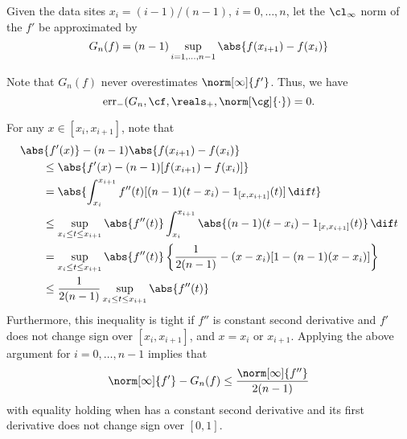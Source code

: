 


Given the data sites $x_i=(i-1)/(n-1)$, $i=0, \ldots, n$, let the $\cl_\infty$ norm of the $f'$ be approximated by
\begin{equation}\label{estfirstderiv}
G_n(f) = (n-1) \sup_{i=1, \ldots, n-1} \abs{f(x_{i+1})-f(x_i)}
\end{equation}

Note that $G_n(f)$ never overestimates $\norm[\infty]{f'}$. Thus, we have
$$\err_{-}(G_n,\cf,\reals_{+},\norm[\cg]{\cdot})=0.$$

For any $x \in [x_{i}, x_{i+1}]$, note that
\begin{align*}
\MoveEqLeft{\abs{f'(x)} - (n-1) \abs{f(x_{i+1})-f(x_i)}} \\
 & \le \abs{f'(x) - (n-1)[f(x_{i+1})-f(x_i)]} \\
&=\abs{ \int_{x_i}^{x_{i+1}} f''(t) [(n-1)(t-x_i) -  1_{[x,x_{i+1}]}(t)] \, \dif t} \\
& \le \sup_{x_i \le t \le x_{i+1}} \abs{f''(t)} \int_{x_i}^{x_{i+1}} \abs{  (n-1)(t-x_i) -  1_{[x,x_{i+1}]}(t)} \, \dif t \\
&=\sup_{x_i \le t \le x_{i+1}} \abs{f''(t)} \left \{\frac{1}{2(n-1)} - (x-x_i)[1-(n-1)(x-x_i)] \right\} \\
&\le \frac{1}{2(n-1)}\sup_{x_i \le t \le x_{i+1}} \abs{f''(t)}
\end{align*}
Furthermore, this inequality is tight if $f''$ is constant second derivative and $f'$ does not change sign over $[x_{i}, x_{i+1}]$, and $x=x_i$ or $x_{i+1}$.  Applying the above argument for $i=0, \ldots, n-1$ implies that
\[
\norm[\infty]{f'} - G_n(f) \le \frac{\norm[\infty]{f''}}{2(n-1)}
\]
with equality holding when has a constant second derivative and its first derivative does not change sign over $[0,1]$.

